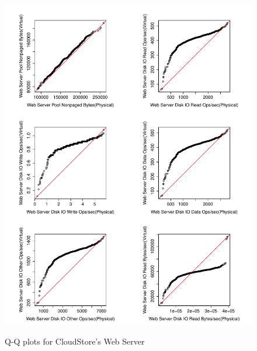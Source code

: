 \begin{figure}[tbh]
	\centering
	{\includegraphics[width=1.0\textwidth]{figures/appendix/qq_plots/CloudStore/Web_Server/Third_six.pdf}}
	\caption{Q-Q plots for CloudStore's Web Server}
\end{figure}

